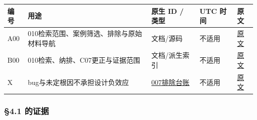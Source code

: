\documentclass[
]{article}
\newcounter{none} %
\begin{document}
{\def\LTcaptype{none} %
\begin{longtable}[]{@{}
  >{\raggedright\arraybackslash}p{}
  >{\raggedright\arraybackslash}p{}
  >{\raggedright\arraybackslash}p{}
  >{\raggedright\arraybackslash}p{}
  >{\raggedright\arraybackslash}p{}@{}}
\toprule\noalign{}
\begin{minipage}[b]{\linewidth}\raggedright
编号
\end{minipage} & \begin{minipage}[b]{\linewidth}\raggedright
用途
\end{minipage} & \begin{minipage}[b]{\linewidth}\raggedright
原生 ID / 类型
\end{minipage} & \begin{minipage}[b]{\linewidth}\raggedright
UTC 时间
\end{minipage} & \begin{minipage}[b]{\linewidth}\raggedright
原文
\end{minipage} \\
\midrule\noalign{}
\endhead
\bottomrule\noalign{}
\endlastfoot
A00 & 010检索范围、案例筛选、排除与原始材料导航 & 文档/源码 & 不适用 &
\href{/Users/oopslink/works/research/agent-harness-study/run-001/papers-010/phase1_evidence/findings.md}{原文} \\
B00 & 010检索、纳排、C07更正与证据范围 & 文档/派生索引 & 不适用 &
\href{/Users/oopslink/works/research/agent-harness-study/run-001/papers-010/phase1_evidence/findings.md}{原文} \\
X & bug与未定根因不承担设计负效应 &
\href{/Users/oopslink/works/codes/oopslink/agent-center/docs/plans/reports/agent-harness-identity-cases-007.md}{007排除台账}
& 不适用 &
\href{/Users/oopslink/works/codes/oopslink/agent-center/docs/plans/reports/agent-harness-identity-cases-007.md}{原文} \\
\end{longtable}
}

\subsubsection{§4.1 的证据}\label{ux7684ux8bc1ux636e-2}
\end{document}
